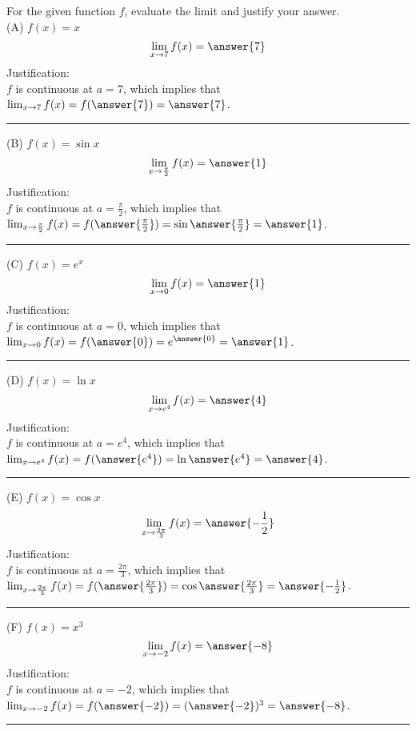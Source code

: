 \documentclass{ximera}
\author{Nela Lakos}
\begin{document}
\begin{exercise}


For the given function $f$, evaluate the limit and justify your answer.\\



(A) $f(x)=x$
 \[
\lim_{x\to 7}f(x) = \answer{7}
\] 
Justification:\\ $f$ is continuous at $a=7$, which implies that
$\lim_{x\to 7}f(x)=f(\answer{7})=\answer{7}$.

\noindent\rule[0.5ex]{\linewidth}{.2pt}

(B) $f(x)=\sin{x}$
 \[
\lim_{x\to \frac{\pi}{2}}f(x) = \answer{1}
\] 
Justification:\\ $f$ is continuous at $a=\frac{\pi}{2}$, which implies that\\[1em]
$\lim_{x\to \frac{\pi}{2}}f(x)=f(\answer{\frac{\pi}{2}})=\sin{\answer{\frac{\pi}{2}}}=\answer{1}$.

\noindent\rule[0.5ex]{\linewidth}{.2pt}
(C) $f(x)=e^{x}$
 \[
\lim_{x\to 0}f(x) = \answer{1}
\] 
Justification:\\ $f$ is continuous at $a=0$, which implies that\\[1em]
$\lim_{x\to 0}f(x)=f(\answer{0})=e^{\answer{0}}=\answer{1}$.

\noindent\rule[0.5ex]{\linewidth}{.2pt}
(D) $f(x)=\ln{x}$
 \[
\lim_{x\to e^{4}}f(x) = \answer{4}
\] 
Justification:\\ $f$ is continuous at $a=e^{4}$, which implies that\\[1em]
$\lim_{x\to e^{4}}f(x)=f(\answer{e^{4}})=\ln{\answer{e^{4}}}=\answer{4}$.

\noindent\rule[0.5ex]{\linewidth}{.2pt}
(E) $f(x)=\cos{x}$
 \[
\lim_{x\to \frac{2\pi}{3}}f(x) = \answer{-\frac{1}{2}}
\] 
Justification:\\ $f$ is continuous at $a= \frac{2\pi}{3}$, which implies that\\[1em]
$\lim_{x\to \frac{2\pi}{3}}f(x)=f(\answer{ \frac{2\pi}{3}})=\cos{\answer{ \frac{2\pi}{3}}}=\answer{-\frac{1}{2}}$.

\noindent\rule[0.5ex]{\linewidth}{.2pt}
(F) $f(x)=x^3$
 \[
\lim_{x\to -2}f(x) = \answer{-8}
\] 
Justification:\\ $f$ is continuous at $a=-2$, which implies that\\[1em]
$\lim_{x\to -2}f(x)=f(\answer{ -2})=(\answer{-2 })^3=\answer{-8}$.

\noindent\rule[0.5ex]{\linewidth}{.2pt}
\end{exercise}
\end{document}
